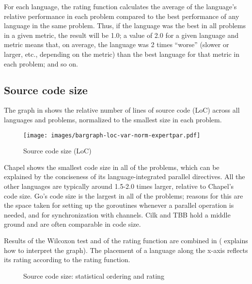 \vspace{-2ex}


For each language, the rating function calculates the average of the language's relative performance in each problem compared to the best performance of any language in the same problem. Thus, if the language was the best in all problems in a given metric, the result will be 1.0; a value of 2.0 for a given language and metric means that, on average, the language was 2 times ``worse'' (slower or larger, etc., depending on the metric) than the best language for that metric in each problem; and so on.

\subsection{Source code size}
\label{sec:source-code-size}

The graph in  shows the relative number of lines of source code (LoC) across all languages and problems, normalized to the smallest size in each problem.

\begin{figure}[htbp]
  \centering
  \texttt{[image: images/bargraph-loc-var-norm-expertpar.pdf]}
  \caption{Source code size (LoC)}
  \label{fig:loc}
\end{figure}

Chapel shows the smallest code size in all of the problems, which can be explained by the conciseness of its language-integrated parallel directives. All the other languages are typically around 1.5-2.0 times larger, relative to Chapel's code size. Go's code size is the largest in all of the problems; reasons for this are the space taken for setting up the goroutines whenever a parallel operation is needed, and for synchronization with channels. Cilk and TBB hold a middle ground and are often comparable in code size.

Results of the Wilcoxon test and of the rating function are combined in  ( explains how to interpret the graph). The placement of a language along the x-axis reflects its rating according to the rating function.

\begin{figure}[htbp]
  \centering
  \vspace{-2ex}
  \caption{Source code size: statistical ordering and rating}
  \label{fig:ord:size}
\end{figure}

